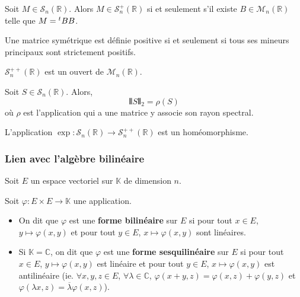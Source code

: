   \begin{corollary}
    Soit $M \in \mathcal{S}_n(\mathbb{R})$. Alors $M \in \mathcal{S}_n^+(\mathbb{R})$ si et seulement s'il existe $B \in \mathcal{M}_n(\mathbb{R})$ telle que $M = \mathstrut ^t BB$.
  \end{corollary}
  
  \begin{theorem}
    Une matrice symétrique est définie positive si et seulement si tous ses mineurs principaux sont strictement positifs.
  \end{theorem}
  
  \begin{corollary}
    $\mathcal{S}_n^{++}(\mathbb{R})$ est un ouvert de $\mathcal{M}_n(\mathbb{R})$.
  \end{corollary}
  
  
  \begin{lemma}
    Soit $S \in \mathcal{S}_n(\mathbb{R})$. Alors,
    \[ \VERT S \VERT_2 = \rho(S) \]
    où $\rho$ est l'application qui a une matrice y associe son rayon spectral.
  \end{lemma}
  
  
  \begin{theorem}
    L'application $\exp : \mathcal{S}_n(\mathbb{R}) \rightarrow \mathcal{S}^{++}_n(\mathbb{R})$ est un homéomorphisme.
  \end{theorem}
  
  \subsubsection{Lien avec l'algèbre bilinéaire}
  
  
  Soit $E$ un espace vectoriel sur $\mathbb{K}$ de dimension $n$.
  
  \begin{definition}
    Soit $\varphi : E \times E \rightarrow \mathbb{K}$ une application.
    \begin{itemize}
      \item On dit que $\varphi$ est une \textbf{forme bilinéaire} sur $E$ si pour tout $x \in E$, $y \mapsto \varphi(x, y)$ et pour tout $y \in E$, $x \mapsto \varphi(x, y)$ sont linéaires.
      \item Si $\mathbb{K} = \mathbb{C}$, on dit que $\varphi$ est une \textbf{forme sesquilinéaire} sur $E$ si pour tout $x \in E$, $y \mapsto \varphi(x, y)$ est linéaire et pour tout $y \in E$, $x \mapsto \varphi(x, y)$ est antilinéaire (ie. $\forall x, y, z \in E$, $\forall \lambda \in \mathbb{C}$, $\varphi(x+y, z) = \varphi(x,z) + \varphi(y,z)$ et $\varphi(\lambda x, z) = \overline{\lambda} \varphi(x,z)$).
    \end{itemize}
  \end{definition}
  
